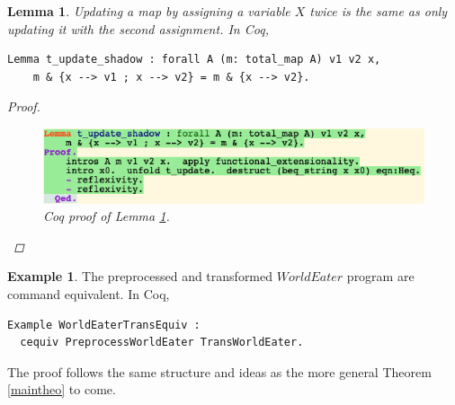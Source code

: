 \documentclass[12pt,notitlepage]{report}
\theoremstyle{plain}
\newtheorem{lem}[theo]{Lemma}
\theoremstyle{definition}
\newtheorem{example}[theo]{Example}
\numberwithin{equation}{section}
\begin{document}
\begin{lem}\label{update_shadow}
Updating a map by assigning a variable $X$ twice is the same as only updating it with the second assignment.  In Coq,
\begin{verbatim}
Lemma t_update_shadow : forall A (m: total_map A) v1 v2 x,
    m & {x --> v1 ; x --> v2} = m & {x --> v2}.
\end{verbatim}
\begin{proof}\noindent
   \begin{figure}[H]
        \centering
        \includegraphics[scale=0.6]{lemma_final_1}
        \caption{Coq proof of Lemma \ref{update_shadow}.}
        \label{fig:hoare21}
        \end{figure}
\end{proof}
\end{lem}

\begin{example}\label{WE_example}
The preprocessed and transformed $WorldEater$ program are command equivalent.  In Coq,
\begin{verbatim}
Example WorldEaterTransEquiv : 
  cequiv PreprocessWorldEater TransWorldEater.
\end{verbatim}
The proof follows the same structure and ideas as the more general Theorem \ref{maintheo} to come.
\end{example}
\end{document}
